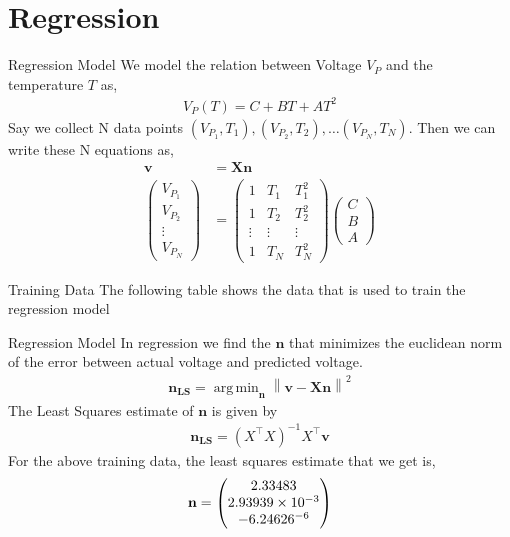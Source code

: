 \documentclass{beamer}
\DeclareMathOperator*{\argmin}{arg\,min}
\theoremstyle{remark}
\providecommand{\norm}[1]{\left\lVert#1\right\rVert}
\newcommand{\myvec}[1]{\ensuremath{\begin{pmatrix}#1\end{pmatrix}}}
\renewcommand{\vec}[1]{\mathbf{\boldsymbol{#1}}}
\begin{document}
\section{Regression}
\begin{frame}{Regression Model}
	We model the relation between Voltage $V_P$ and the temperature $T$ as,
	\begin{align}
		V_P(T) = C+BT+AT^2
	\end{align}
Say we collect N data points $(V_{P_1},T_1),(V_{P_2},T_2),\hdots (V_{P_N},T_N)$. Then we can write these N equations as,
	\begin{align}
		\vec{v} &= \vec{X} \vec{n}\\ 
		\myvec{V_{P_1}\\V_{P_2}\\\vdots \\ V_{P_N}} &= \myvec{1& T_1 & T_1^{2}\\ 1& T_2 & T_2^{2}\\ \vdots & \vdots & \vdots  \\ 1& T_N & T_N^{2}} \myvec{C\\ B\\ A}
	\end{align}
\end{frame}
\begin{frame}{Training Data}
    The following table shows the data that is used to train the regression model
	\begin{table}[!ht]
    	\centering
    	
    	\caption{Training data}
    	\label{tab:train}
	\end{table}
\end{frame}
\begin{frame}{Regression Model}
	In regression we find the $\vec{n}$ that minimizes the euclidean norm of the error between actual voltage and predicted voltage.
	\begin{align}
		\vec{n_{LS}} = \argmin_{\vec{n}} \norm{\vec{v}-\vec{X}\vec{n}}^2
	\end{align}
	The Least Squares estimate of $\vec{n}$ is given by
	\begin{align}
		\vec{n_{LS}} = (X^{\top}X)^{-1}X^{\top}\vec{v}
	\end{align}
	For the above training data, the least squares estimate that we get is,
	\begin{align}
		\vec{n} = \myvec{2.33483\\ 2.93939\times10^{-3}\\-6.24626\time10^{-6}}
	\end{align}
\end{frame}
\end{document}
